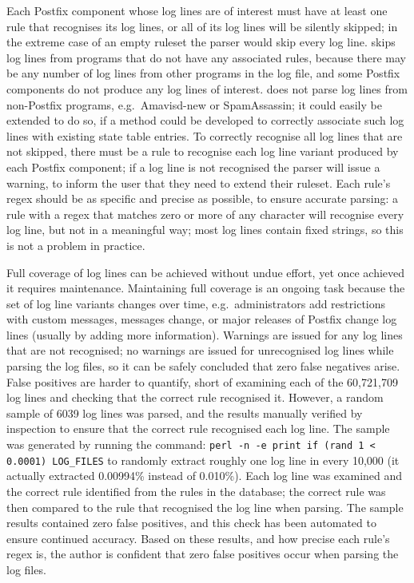 Each Postfix component whose log lines are of interest must have at least
one rule that recognises its log lines, or all of its log lines will be
silently skipped; in the extreme case of an empty ruleset the parser would
skip every log line.  \parsername{} skips log lines from programs that do
not have any associated rules, because there may be any number of log lines
from other programs in the log file, and some Postfix components do not
produce any log lines of interest.  \parsername{} does not parse log lines
from non-Postfix programs, e.g.\ Amavisd-new or SpamAssassin; it could
easily be extended to do so, if a method could be developed to correctly
associate such log lines with existing state table entries.  To correctly
recognise all log lines that are not skipped, there must be a rule to
recognise each log line variant produced by each Postfix component; if a
log line is not recognised the parser will issue a warning, to inform the
user that they need to extend their ruleset.  Each rule's regex should be
as specific and precise as possible, to ensure accurate parsing: a rule
with a regex that matches zero or more of any character will recognise
every log line, but not in a meaningful way; most log lines contain fixed
strings, so this is not a problem in practice.

Full coverage of log lines can be achieved without undue effort, yet once
achieved it requires maintenance.  Maintaining full coverage is an ongoing
task because the set of log line variants changes over time, e.g.\
administrators add restrictions with custom messages, 
messages change, or major releases of Postfix change log lines (usually by
adding more information).  Warnings are issued for any log lines that are
not recognised; no warnings are issued for unrecognised log lines while
parsing the \numberOFlogFILES{} log files, so it can be safely concluded
that zero false negatives arise.  False positives are harder to quantify,
short of examining each of the 60,721,709 log lines and checking that the
correct rule recognised it.  However, a random sample of 6039 log lines was
parsed, and the results manually verified by inspection to ensure that the
correct rule recognised each log line.  The sample was generated by running
the command: \newline{} \tab{} \texttt{perl -n -e \singlequote{}print if
(rand 1 < 0.0001)\singlequote{} LOG\_FILES} \newline{} to randomly extract
roughly one log line in every 10,000 (it actually extracted 0.00994\%
instead of 0.010\%).  Each log line was examined and the correct rule
identified from the \numberOFrules{} rules in the database; the correct
rule was then compared to the rule that recognised the log line when
parsing.  The sample results contained zero false positives, and this check
has been automated to ensure continued accuracy.  Based on these results,
and how precise each rule's regex is, the author is confident that zero
false positives occur when parsing the \numberOFlogFILES{} log files.

